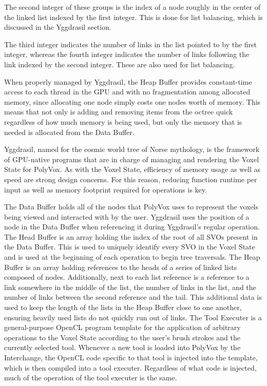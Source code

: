 \documentclass[onecolumn, draftclsnofoot,10pt, compsoc]{IEEEtran}
\newcounter{threesection}[subsubsection]
\newcounter{foursection}[threesection]
\begin{document}
The second integer of these groups is the index of a node roughly in the center of the linked list indexed by the first integer.
This is done for list balancing, which is discussed in the Yggdrasil section.

The third integer indicates the number of links in the list pointed to by the first integer, whereas the fourth integer indicates the number of links following the link indexed by the second integer.
These are also used for list balancing.

When properly managed by Yggdrasil, the Heap Buffer provides constant-time access to each thread in the GPU and with no fragmentation among allocated memory, since allocating one node simply costs one nodes worth of memory.
This means that not only is adding and removing items from the octree quick regardless of how much memory is being used, but only the memory that is needed is allocated from the Data Buffer.


Yggdrasil, named for the cosmic world tree of Norse mythology, is the framework of GPU-native programs that are in charge of managing and rendering the Voxel State for PolyVox.
As with the Voxel State, efficiency of memory usage as well as speed are strong design concerns.
For this reason, reducing function runtime per input as well as memory footprint required for operations is key.

The Data Buffer holds all of the nodes that PolyVox uses to represent the voxels being viewed and interacted with by the user.
Yggdrasil uses the position of a node in the Data Buffer when referencing it during Yggdrasil’s regular operation.
The Head Buffer is an array holding the index of the root of all SVOs present in the Data Buffer.
This is used to uniquely identify every SVO in the Voxel State and is used at the beginning of each operation to begin tree traversals.
The Heap Buffer is an array holding references to the heads of a series of linked lists composed of nodes.
Additionally, next to each list reference is a reference to a link somewhere in the middle of the list, the number of links in the list, and the number of links between the second reference and the tail.
This additional data is used to keep the length of the lists in the Heap Buffer close to one another, ensuring heavily used lists do not quickly run out of links.
The Tool Executer is a general-purpose OpenCL program template for the application of arbitrary operations to the Voxel State according to the user’s brush strokes and the currently selected tool.
Whenever a new tool is loaded into PolyVox by the Interchange, the OpenCL code specific to that tool is injected into the template, which is then compiled into a tool executer.
Regardless of what code is injected, much of the operation of the tool executer is the same.
\end{document}
